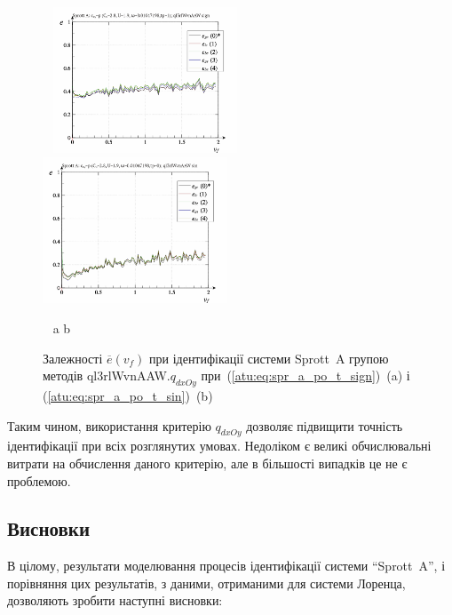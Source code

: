 \begin{figure}[htb!]
\begin{center}
  ~ \hfill
    \includegraphics[width=0.49\textwidth]{p/cha/spr_a/ql3rlWvnAAW_dxOy/sprott_a_id2-p_v_f_sign.png}
    \hfill
    \includegraphics[width=0.49\textwidth]{p/cha/spr_a/ql3rlWvnAAW_dxOy/sprott_a_id2-p_v_f_sin.png}
  \hfill ~
\end{center}
  \vspace{-1.0ex}
  \begin{center}
    ~ \hfill a \hfill\hfill b \hfill ~
  \end{center}
  \caption{Залежності $\overline{e} (v_f)$ при ідентифікації системи Sprott~A групою методів ql3rlWvnAAW.$q_{dxOy}$ при~(\ref{atu:eq:spr_a_po_t_sign})~(a) і (\ref{atu:eq:spr_a_po_t_sin})~(b)}
  \label{atu:f:spr_a_v_f_ql3rlWvnAAW_q_dxOy}
\end{figure}

Таким чином, використання критерію
$q_{dxOy}$ дозволяє підвищити точність ідентифікації при всіх
розглянутих умовах. Недоліком є великі обчислювальні витрати
на обчислення даного критерію, але в більшості випадків це не
є проблемою.



\subsection{Висновки}%

В цілому, результати моделювання процесів ідентифікації системи
``Sprott~A'', і порівняння цих результатів, з даними, отриманими для
системи Лоренца, дозволяють зробити наступні висновки:

